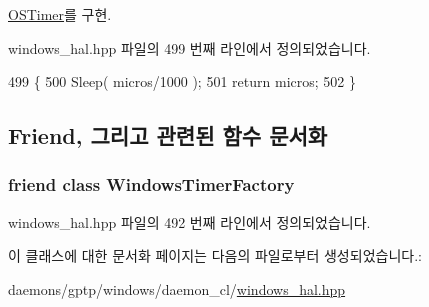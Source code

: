 \hyperlink{class_o_s_timer_a1f92d99fa856da853c92acd11302b9cb}{O\+S\+Timer}를 구현.



windows\+\_\+hal.\+hpp 파일의 499 번째 라인에서 정의되었습니다.


\begin{DoxyCode}
499                                                         \{
500         Sleep( micros/1000 );
501         \textcolor{keywordflow}{return} micros;
502     \}
\end{DoxyCode}


\subsection{Friend, 그리고 관련된 함수 문서화}
\subsubsection[{\texorpdfstring{Windows\+Timer\+Factory}{WindowsTimerFactory}}]{\setlength{\rightskip}{0pt plus 5cm}friend class {\bf Windows\+Timer\+Factory}\hspace{0.3cm}{\ttfamily [friend]}}\hypertarget{class_windows_timer_ab86e064bdc9f1f01440c7506e79008f9}{}\label{class_windows_timer_ab86e064bdc9f1f01440c7506e79008f9}


windows\+\_\+hal.\+hpp 파일의 492 번째 라인에서 정의되었습니다.



이 클래스에 대한 문서화 페이지는 다음의 파일로부터 생성되었습니다.\+:\begin{DoxyCompactItemize}
\item 
daemons/gptp/windows/daemon\+\_\+cl/\hyperlink{windows__hal_8hpp}{windows\+\_\+hal.\+hpp}\end{DoxyCompactItemize}
